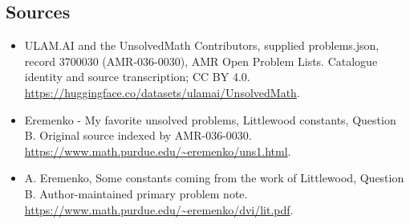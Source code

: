 \documentclass[11pt,a4paper]{article}
\begin{document}
\subsection{Sources}
\begin{itemize}
\item[S1] ULAM.AI and the UnsolvedMath Contributors, supplied problems.json, record 3700030 (AMR-036-0030), AMR Open Problem Lists. Catalogue identity and source transcription; CC BY 4.0.
\url{https://huggingface.co/datasets/ulamai/UnsolvedMath}.
\item[S2] Eremenko - My favorite unsolved problems, Littlewood constants, Question B. Original source indexed by AMR-036-0030.
\url{https://www.math.purdue.edu/~eremenko/uns1.html}.
\item[S3] A. Eremenko, Some constants coming from the work of Littlewood, Question B. Author-maintained primary problem note.
\url{https://www.math.purdue.edu/~eremenko/dvi/lit.pdf}.
\end{itemize}
\end{document}
